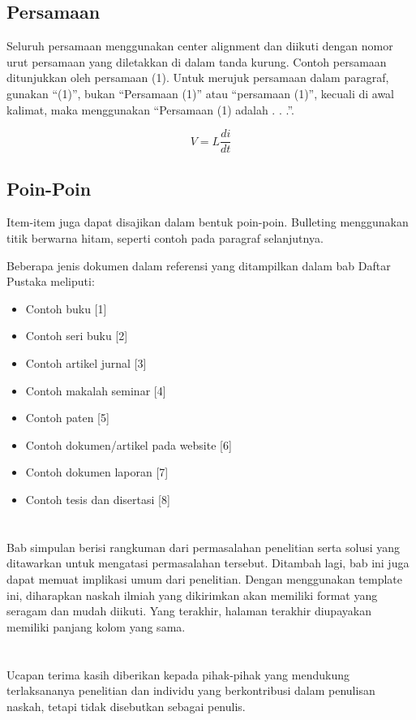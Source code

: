 \documentclass[eng]{JuLIET-class}
\begin{document}
	\subsection{Persamaan}
	Seluruh persamaan menggunakan center alignment dan diikuti dengan nomor urut persamaan yang diletakkan di dalam tanda kurung. Contoh persamaan ditunjukkan oleh persamaan (1). Untuk merujuk persamaan dalam paragraf, gunakan “(1)”, bukan “Persamaan (1)” atau “persamaan (1)”, kecuali di awal kalimat, maka menggunakan “Persamaan (1) adalah . . .”.
	
	\begin{equation}
		V = L\frac{di}{dt}
	\end{equation}
	
	\subsection{Poin-Poin}
	Item-item juga dapat disajikan dalam bentuk poin-poin. Bulleting menggunakan titik berwarna hitam, seperti contoh pada paragraf selanjutnya.
	
	Beberapa jenis dokumen dalam referensi yang ditampilkan dalam bab Daftar Pustaka meliputi:
	
	\begin{itemize}
		\item Contoh buku [1]
		\item Contoh seri buku [2]
		\item Contoh artikel jurnal [3]
		\item Contoh makalah seminar [4]
		\item Contoh paten [5]
		\item Contoh dokumen/artikel pada website [6]
		\item Contoh dokumen laporan [7]
		\item Contoh tesis dan disertasi [8]
		
	\end{itemize}
	
	\section{}
	Bab simpulan berisi rangkuman dari permasalahan penelitian serta solusi yang ditawarkan untuk mengatasi permasalahan tersebut. Ditambah lagi, bab ini juga dapat memuat implikasi umum dari penelitian. Dengan menggunakan template ini, diharapkan naskah ilmiah yang dikirimkan akan memiliki format yang seragam dan mudah diikuti. Yang terakhir, halaman terakhir diupayakan memiliki panjang kolom yang sama.
	
	\section{}
	Ucapan terima kasih diberikan kepada pihak-pihak yang mendukung terlaksananya penelitian dan individu yang berkontribusi dalam penulisan naskah, tetapi tidak disebutkan sebagai penulis.
	
	\renewcommand\refname{\centering DAFTAR PUSTAKA}
	
\end{document}
